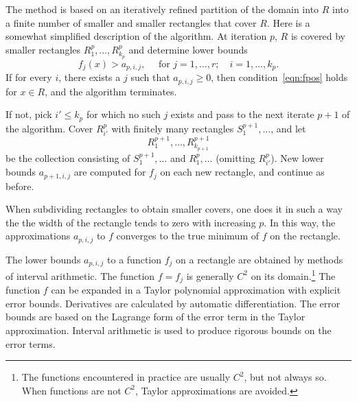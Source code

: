 The method is based on an iteratively refined 
partition of the domain into $R$
into a finite number of smaller and smaller rectangles that cover $R$.
Here is a somewhat simplified description of the algorithm.
At iteration $p$,   $R$ is covered by smaller rectangles
$R^p_1,\ldots,R^p_{k_p}$ and determine lower bounds
   $$
   f_j(x) > a_{p,i,j},\quad \text{ for } j=1,\ldots,r;\quad i=1,\ldots,k_p.
   $$
If for every $i$, there exists a $j$ such that $a_{p,i,j}\ge 0$,
then condition~\ref{eqn:fpos} holds for $x\in R$, and the algorithm
terminates.

If not, pick $i' \le k_p$ for which no such $j$ exists and
pass to the next iterate $p+1$ of the algorithm.  Cover $R^p_{i'}$
with finitely many rectangles $S^{p+1}_1,\ldots$, and let
  $$
  R^{p+1}_1,\ldots,R^{p+1}_{k_{p+1}}
  $$
be the collection consisting of $S^{p+1}_1,\ldots$ and $R^p_1,\ldots$
(omitting $R^p_{i'}$).  New lower bounds $a_{p+1,i,j}$  are computed
for $f_j$ on each new rectangle, and continue as before.


When subdividing rectangles to obtain smaller covers, one does
it in such a way the the width of the rectangle tends to zero
with increasing $p$.
In this way,  the approximations
$a_{p,i,j}$ to $f$  converges to the true minimum of $f$ on the
rectangle.

The lower bounds $a_{p,i,j}$ to a function $f_j$ on a rectangle
are obtained by methods of interval arithmetic.  The function
$f=f_j$ is generally $C^2$ on its domain.\footnote{The functions
 encountered in practice are usually $C^2$, but not always so.  When functions are not
$C^2$,  Taylor approximations are avoided.}  
The function $f$ can be expanded in a Taylor polynomial approximation with
explicit error bounds.  Derivatives are calculated by automatic
differentiation.  The error bounds are based on the Lagrange form of
the error term in the Taylor approximation.  Interval arithmetic is used to produce rigorous bounds on the error terms.


